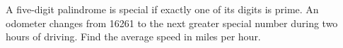 A five-digit palindrome is special if exactly one of its digits is prime. An odometer changes from 16261 to the next greater special number during two hours of driving. Find the average speed in miles per hour.

